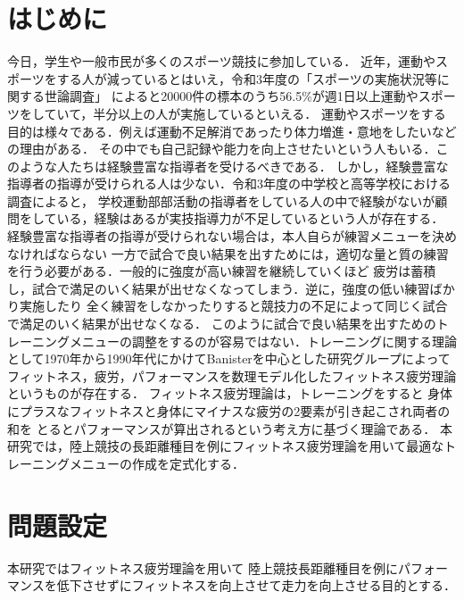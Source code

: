 \documentclass[12pt,fleqn]{jreport}
\begin{document}
\newpage
{}   %
\setlength{\baselineskip}{20pt}   %
\tableofcontents   %
\newpage
\listoffigures   %
\listoftables   %
\clearpage   %
\newpage
\chapter{はじめに}
\large
今日，学生や一般市民が多くのスポーツ競技に参加している．
近年，運動やスポーツをする人が減っているとはいえ，令和3年度の「スポーツの実施状況等に関する世論調査」
によると20000件の標本のうち56.5\%が週1日以上運動やスポーツをしていて，半分以上の人が実施しているといえる\cite{sports1}．
運動やスポーツをする目的は様々である．例えば運動不足解消であったり体力増進・意地をしたいなどの理由がある．
その中でも自己記録や能力を向上させたいという人もいる．このような人たちは経験豊富な指導者を受けるべきである．
しかし，経験豊富な指導者の指導が受けられる人は少ない．令和3年度の中学校と高等学校における調査によると，
学校運動部部活動の指導者をしている人の中で経験がないが顧問をしている，経験はあるが実技指導力が不足しているという人が存在する\cite{sports2}．
経験豊富な指導者の指導が受けられない場合は，本人自らが練習メニューを決めなければならない
一方で試合で良い結果を出すためには，適切な量と質の練習を行う必要がある．一般的に強度が高い練習を継続していくほど
疲労は蓄積し，試合で満足のいく結果が出せなくなってしまう．逆に，強度の低い練習ばかり実施したり
全く練習をしなかったりすると競技力の不足によって同じく試合で満足のいく結果が出せなくなる．
このように試合で良い結果を出すためのトレーニングメニューの調整をするのが容易ではない．トレーニングに関する理論として1970年から1990年代にかけてBanisterを中心とした研究グループによって
フィットネス，疲労，パフォーマンスを数理モデル化したフィットネス疲労理論というものが存在する\cite{bani}．
フィットネス疲労理論は，トレーニングをすると
身体にプラスなフィットネスと身体にマイナスな疲労の2要素が引き起こされ両者の和を
とるとパフォーマンスが算出されるという考え方に基づく理論である．
本研究では，陸上競技の長距離種目を例にフィットネス疲労理論を用いて最適なトレーニングメニューの作成を定式化する．
\newpage
\chapter{問題設定}
本研究ではフィットネス疲労理論\cite{bani}を用いて
陸上競技長距離種目を例にパフォーマンスを低下させずにフィットネスを向上させて走力を向上させる目的とする．
\vspace{1cm}
\end{document}
